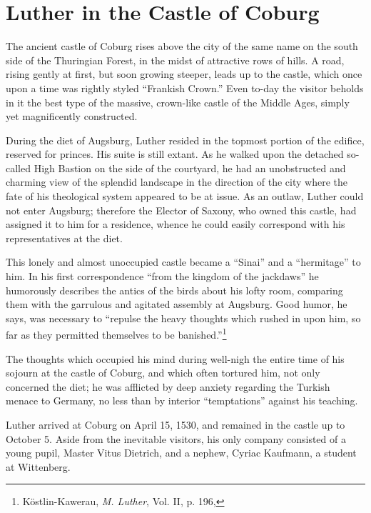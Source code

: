 \section{Luther in the Castle of Coburg}

The ancient castle of Coburg rises above the city of the same name
on the south side of the Thuringian Forest, in the midst of attractive
rows of hills. A road, rising gently at first, but soon growing steeper,
leads up to the castle, which once upon a time was rightly styled
“Frankish Crown.” Even to-day the visitor beholds in it the best type
of the massive, crown-like castle of the Middle Ages, simply yet magnificently
constructed.

During the diet of Augsburg, Luther resided in the topmost portion
of the edifice, reserved for princes. His suite is still extant. As he
walked upon the detached so-called High Bastion on the side of the
courtyard, he had an unobstructed and charming view of the splendid
landscape in the direction of the city where the fate of his theological
system appeared to be at issue. As an outlaw, Luther could not enter
Augsburg; therefore the Elector of Saxony, who owned this castle,
had assigned it to him for a residence, whence he could easily correspond
with his representatives at the diet.

This lonely and almost unoccupied castle became a “Sinai” and a
“hermitage” to him. In his first correspondence “from the kingdom
of the jackdaws” he humorously describes the antics of the birds about
his lofty room, comparing them with the garrulous and agitated assembly
at Augsburg. Good humor, he says, was necessary to “repulse the heavy
thoughts which rushed in upon him, so far as they
permitted themselves to be banished.”\footnote
{Köstlin-Kawerau, \textit{M. Luther}, Vol. II, p. 196,}

The thoughts which occupied his mind during well-nigh the entire
time of his sojourn at the castle of Coburg, and which often tortured
him, not only concerned the diet; he was afflicted by deep anxiety
regarding the Turkish menace to Germany, no less than by interior
“temptations” against his teaching.

Luther arrived at Coburg on April 15, 1530, and remained in the
castle up to October 5. Aside from the inevitable visitors, his only
company consisted of a young pupil, Master Vitus Dietrich, and a
nephew, Cyriac Kaufmann, a student at Wittenberg.

